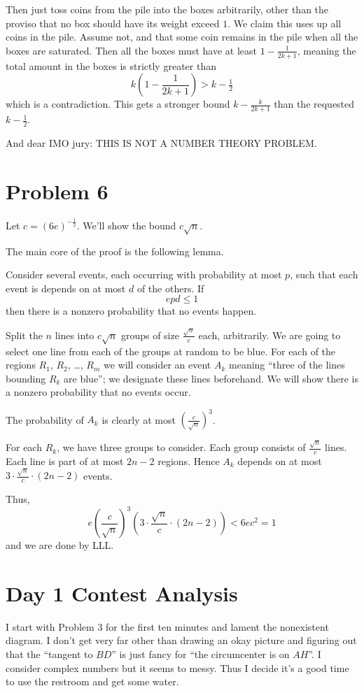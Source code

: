 \documentclass[11pt]{scrreprt}
\numberwithin{figure}{chapter}
\begin{document}
Then just toss coins from the pile into the boxes arbitrarily, other than the proviso that no box should have its weight exceed $1$.
We claim this uses up all coins in the pile. Assume not, and that some coin remains in the pile when all the boxes are saturated.
Then all the boxes must have at least $1 -\frac{1}{2k+1}$, meaning the total amount in the boxes is strictly greater than
\[ k \left( 1 - \frac{1}{2k+1} \right) > k - \tfrac 12 \]
which is a contradiction. This gets a stronger bound $k - \frac{k}{2k+1}$ than the requested $k-\tfrac 12$.

And dear IMO jury: THIS IS NOT A NUMBER THEORY PROBLEM.


\section{Problem 6}
Let $c = (6e)^{-\frac12}$. We'll show the bound $c \sqrt n$.

The main core of the proof is the following lemma.
\begin{lemma*}
  Consider several events, each occurring with probability at most $p$, such that
  each event is depends on at most $d$ of the others. If \[ epd \le 1 \]
  then there is a nonzero probability that no events happen.
\end{lemma*}
Split the $n$ lines into $c \sqrt n$ groups of size $\frac{\sqrt n}{c}$ each, arbitrarily.
We are going to select one line from each of the groups at random to be blue.
For each of the regions $R_1$, $R_2$, \dots, $R_m$ we will consider an event $A_k$ meaning ``three of the lines bounding $R_k$ are blue'';
we designate these lines beforehand.
We will show there is a nonzero probability that no events occur.

The probability of $A_k$ is clearly at most $\left( \frac{c}{\sqrt n} \right)^3$.

For each $R_k$, we have three groups to consider. Each group consists of $\frac{\sqrt n}{c}$ lines. Each line is part of at most $2n-2$ regions.
Hence $A_k$ depends on at most $3 \cdot \frac{\sqrt n}{c} \cdot (2n-2)$ events.

Thus,
\[ e \left( \frac{c}{\sqrt n} \right)^3 \left( 3 \cdot \frac{\sqrt{n}}{c} \cdot (2n-2) \right)
  < 6ec^2 = 1 \]
and we are done by LLL.


\section{Day 1 Contest Analysis}
I start with Problem 3 for the first ten minutes and lament the nonexistent diagram. I don't get very far other than drawing an okay picture and figuring out that the ``tangent to $BD$'' is just fancy for ``the circumcenter is on $AH$''.
I consider complex numbers but it seems to messy.
Thus I decide it's a good time to use the restroom and get some water.
\end{document}
